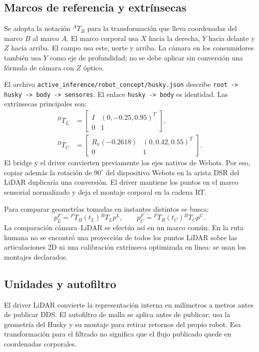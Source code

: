 \documentclass[11pt,a4paper]{article}
\newcommand{\code}[1]{\nolinkurl{#1}}
\newcommand{\file}[1]{\nolinkurl{#1}}
\newcommand{\trans}[2]{{}^{#1}\!T_{#2}}
\begin{document}
\subsection{Marcos de referencia y extrínsecas}
Se adopta la notación $\trans{A}{B}$ para la transformación que lleva coordenadas
del marco $B$ al marco $A$. El marco corporal usa $X$ hacia la derecha, $Y$ hacia
delante y $Z$ hacia arriba. El campo usa este, norte y arriba. La cámara en los
consumidores también usa $Y$ como eje de profundidad; no se debe aplicar sin
conversión una fórmula de cámara con $Z$ óptico.~\cite{ekfheader,mounts,graphpublisher}

El archivo \file{active_inference/robot_concept/husky.json} describe
\code{root -> husky -> body -> sensores}. El enlace \code{husky -> body} es
identidad. Las extrínsecas principales son:
\begin{align}
\trans{B}{L}&=\begin{bmatrix}I&(0,-0.25,0.95)^T\\0&1\end{bmatrix},\\
\trans{B}{C}&=\begin{bmatrix}R_x(-0.2618)&(0,0.42,0.55)^T\\0&1\end{bmatrix}.
\end{align}
El bridge y el driver convierten previamente los ejes nativos de Webots. Por eso,
copiar además la rotación de $90^\circ$ del dispositivo Webots en la arista DSR del
LiDAR duplicaría una conversión. El driver mantiene los puntos en el marco sensorial
normalizado y deja el montaje corporal en la cadena RT.~\cite{mounts,lidardriver,proto}

Para comparar geometrías tomadas en instantes distintos se busca:
\begin{equation}
 p^F_L=\trans{F}{B}(t_L)\trans{B}{L}p^L,
 \qquad p^F_C=\trans{F}{B}(t_C)\trans{B}{C}p^C.
\end{equation}
La comparación cámara--LiDAR se efectúa así en un marco común. En la ruta humana
no se encontró una proyección de todos los puntos LiDAR sobre las articulaciones 2D
ni una calibración extrínseca optimizada en línea: se usan los montajes declarados.
\cite{lidarreader,skeletonsource,humanlidar}

\subsection{Unidades y autofiltro}
El driver LiDAR convierte la representación interna en milímetros a metros antes
de publicar DDS. El autofiltro de malla se aplica antes de publicar; usa la geometría
del Husky y su montaje para retirar retornos del propio robot. Esa transformación
para el filtrado no significa que el flujo publicado quede en coordenadas corporales.
\cite{lidardriver,lidarconfig}
\end{document}
